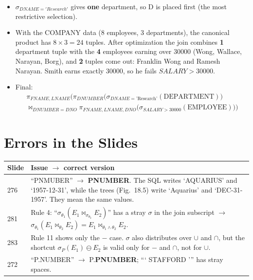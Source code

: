 \documentclass[10pt,a4paper]{article}
\newcommand{\R}[1]{\mathrm{#1}}
\begin{document}
\begin{itemize}
  \item $\sigma_{DNAME='Research'}$ gives \textbf{one} department, so D is placed first (the most restrictive selection).
  \item With the COMPANY data (8 employees, 3 departments), the canonical product has $8 \times 3 = 24$ tuples. After optimization the join combines \textbf{1} department tuple with the \textbf{4} employees earning over 30000 (Wong, Wallace, Narayan, Borg), and \textbf{2} tuples come out: Franklin Wong and Ramesh Narayan. Smith earns exactly 30000, so he fails $SALARY > 30000$.
  \item Final:
\begin{multline*}
\pi_{FNAME,LNAME}\Big(\pi_{DNUMBER}\big(\sigma_{DNAME=\text{'Research'}}(\R{DEPARTMENT})\big)\\
\bowtie_{DNUMBER=DNO} \pi_{FNAME,LNAME,DNO}\big(\sigma_{SALARY>30000}(\R{EMPLOYEE})\big)\Big)
\end{multline*}
\end{itemize}

\section{Errors in the Slides}

\begin{warnbox}[Corrections]
\small
\begin{tabularx}{\linewidth}{@{}l X@{}}
\toprule
\textbf{Slide} & \textbf{Issue $\to$ correct version}\\\midrule
276 & ``PNMUBER'' $\to$ \textbf{PNUMBER}. The SQL writes `AQUARIUS' and `1957-12-31', while the trees (Fig.~18.5) write `Aquarius' and `DEC-31-1957'. They mean the same values.\\
281 & Rule 4: ``$\sigma_{\theta_1}(E_1 \bowtie_{\sigma_{\theta_2}} E_2)$'' has a stray $\sigma$ in the join subscript $\to$ $\sigma_{\theta_1}(E_1 \bowtie_{\theta_2} E_2) = E_1 \bowtie_{\theta_1 \wedge \theta_2} E_2$.\\
283 & Rule 11 shows only the $-$ case. $\sigma$ also distributes over $\cup$ and $\cap$, but the shortcut $\sigma_P(E_1) \ominus E_2$ is valid only for $-$ and $\cap$, not for $\cup$.\\
272 & ``P.NUMBER'' $\to$ P.\textbf{PNUMBER}; ``‘ STAFFORD ’'' has stray spaces.\\
\bottomrule
\end{tabularx}
\end{warnbox}
\end{document}
